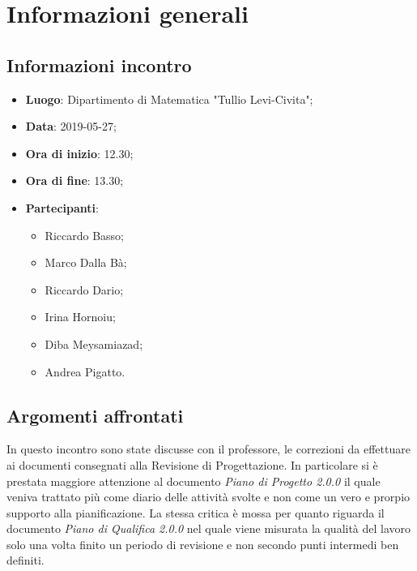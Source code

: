 \section{Informazioni generali}

\subsection{Informazioni incontro}
\begin{itemize}
	\item \textbf{Luogo}: Dipartimento di Matematica "Tullio Levi-Civita";
	\item \textbf{Data}: 2019-05-27;
	\item \textbf{Ora di inizio}: 12.30;
	\item \textbf{Ora di fine}: 13.30;
	\item \textbf{Partecipanti}: 
	\begin{itemize}
		\item Riccardo Basso;
		\item Marco Dalla Bà;
		\item Riccardo Dario;
		\item Irina Hornoiu;
		\item Diba Meysamiazad;
		\item Andrea Pigatto.	
	\end{itemize}
\end{itemize}

\subsection{Argomenti affrontati}
In questo incontro sono state discusse con il professore, le correzioni da effettuare ai documenti consegnati alla Revisione di Progettazione.
In particolare si è prestata maggiore attenzione al documento \textit{Piano di Progetto 2.0.0} il quale veniva trattato più come diario delle attività svolte e non come un vero e prorpio supporto alla pianificazione. La stessa critica è mossa per quanto riguarda il documento \textit{Piano di Qualifica 2.0.0} nel quale viene misurata la qualità del lavoro solo una volta finito un periodo di revisione e non secondo punti intermedi ben definiti.
